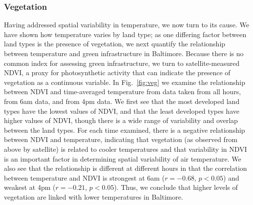 \documentclass[draft,linenumbers]{agujournal}
\begin{document}

\subsubsection{Vegetation}
Having addressed spatial variability in temperature, we now turn to its cause. We have shown how temperature varies by land type; as one differing factor between land types is the presence of vegetation, we next quantify the relationship between temperature and green infrastructure in Baltimore. 
Because there is no common index for assessing green infrastructure, we turn to satellite-measured NDVI, a proxy for photosynthetic activity that can indicate the presence of vegetation as a continuous variable. 
In Fig.~\ref{fig:veg} we examine the relationship between NDVI and time-averaged temperature from data taken from all hours, from 6am data, and from 4pm data. We first see that the most developed land types have the lowest values of NDVI, and that the least developed types have higher values of NDVI, though there is a wide range of variability and overlap between the land types. For each time examined, there is a negative relationship between NDVI and temperature, indicating that vegetation (as observed from above by satellite) is related to cooler temperatures and  that variability in NDVI is an important factor in determining spatial variability of air temperature. We also see that the relationship is different at different hours in that the correlation between temperature and NDVI is strongest at 6am ($r = -0.68$, $p< 0.05$) and weakest at 4pm ($r= -0.21$, $p<0.05$). Thus, we conclude that higher levels of vegetation are linked with lower temperatures in Baltimore. 
\end{document}
